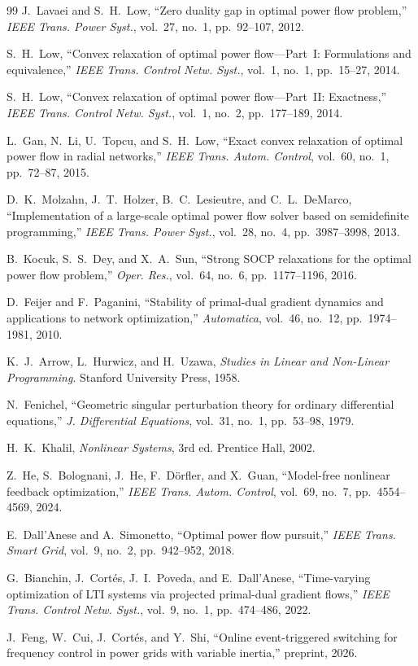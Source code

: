 \documentclass[11pt,onecolumn]{article}
\theoremstyle{definition}
\theoremstyle{remark}
\begin{document}
\begin{thebibliography}{99}
J.~Lavaei and S.~H.~Low, ``Zero duality gap in optimal power flow problem,'' \emph{IEEE Trans. Power Syst.}, vol.~27, no.~1, pp.~92--107, 2012.

S.~H.~Low, ``Convex relaxation of optimal power flow---Part~I: Formulations and equivalence,'' \emph{IEEE Trans. Control Netw. Syst.}, vol.~1, no.~1, pp.~15--27, 2014.

S.~H.~Low, ``Convex relaxation of optimal power flow---Part~II: Exactness,'' \emph{IEEE Trans. Control Netw. Syst.}, vol.~1, no.~2, pp.~177--189, 2014.

L.~Gan, N.~Li, U.~Topcu, and S.~H.~Low, ``Exact convex relaxation of optimal power flow in radial networks,'' \emph{IEEE Trans. Autom. Control}, vol.~60, no.~1, pp.~72--87, 2015.

D.~K.~Molzahn, J.~T.~Holzer, B.~C.~Lesieutre, and C.~L.~DeMarco, ``Implementation of a large-scale optimal power flow solver based on semidefinite programming,'' \emph{IEEE Trans. Power Syst.}, vol.~28, no.~4, pp.~3987--3998, 2013.

B.~Kocuk, S.~S.~Dey, and X.~A.~Sun, ``Strong SOCP relaxations for the optimal power flow problem,'' \emph{Oper. Res.}, vol.~64, no.~6, pp.~1177--1196, 2016.

D.~Feijer and F.~Paganini, ``Stability of primal-dual gradient dynamics and applications to network optimization,'' \emph{Automatica}, vol.~46, no.~12, pp.~1974--1981, 2010.

K.~J.~Arrow, L.~Hurwicz, and H.~Uzawa, \emph{Studies in Linear and Non-Linear Programming}. Stanford University Press, 1958.

N.~Fenichel, ``Geometric singular perturbation theory for ordinary differential equations,'' \emph{J. Differential Equations}, vol.~31, no.~1, pp.~53--98, 1979.

H.~K.~Khalil, \emph{Nonlinear Systems}, 3rd ed. Prentice Hall, 2002.

Z.~He, S.~Bolognani, J.~He, F.~D\"{o}rfler, and X.~Guan, ``Model-free nonlinear feedback optimization,'' \emph{IEEE Trans. Autom. Control}, vol.~69, no.~7, pp.~4554--4569, 2024.

E.~Dall'Anese and A.~Simonetto, ``Optimal power flow pursuit,'' \emph{IEEE Trans. Smart Grid}, vol.~9, no.~2, pp.~942--952, 2018.

G.~Bianchin, J.~Cort\'{e}s, J.~I.~Poveda, and E.~Dall'Anese, ``Time-varying optimization of LTI systems via projected primal-dual gradient flows,'' \emph{IEEE Trans. Control Netw. Syst.}, vol.~9, no.~1, pp.~474--486, 2022.

J.~Feng, W.~Cui, J.~Cort\'{e}s, and Y.~Shi, ``Online event-triggered switching for frequency control in power grids with variable inertia,'' preprint, 2026.








\end{thebibliography}
\end{document}
